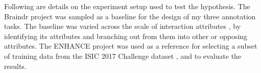 \documentclass[../report.tex]{subfiles}
\begin{document}
Following are details on the experiment setup used to test the hypothesis. The Braindr project \cite{Braindr} was sampled as a baseline for the design of my three annotation tasks. The baseline was varied across the scale of interaction attributes \cite{Lenz2013Attributes}, by identifying its attributes and branching out from them into other or opposing attributes. The ENHANCE project \cite{Ralf2021ENHANCE} was used as a reference for selecting a subset of training data from the ISIC 2017 Challenge dataset \cite{ISIC2017Challenge}, and to evaluate the results.

\begin{figure}[t]
\hfill
{}\hfill
{}\hfill
{}\hfill

\end{figure}
\end{document}
